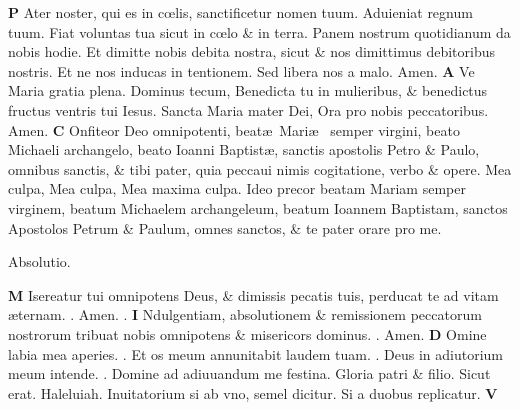 \documentclass[a5paper,10pt]{book}
\def\ae{æ}
\def\oe{œ}
\begin{document}
\begin{multicols*}{2}
\lettrine[lines=2]{\bfseries \color{red} P}{}
Ater noster, qui es in c\oe lis, sanctificetur %
nomen tuum. Aduieniat regnum tuum. Fiat voluntas tua sicut in c\oe lo \& in terra. Panem nostrum quotidianum da nobis hodie. Et dimitte nobis debita nostra, sicut \& nos dimittimus debitoribus nostris. Et ne nos inducas in tentionem. Sed libera nos a malo. Amen.
\lettrine[lines=2]{\bfseries \color{red} A}{}
Ve Maria gratia plena. Dominus tecum, Benedicta tu in mulieribus, \& benedictus fructus ventris tui Iesus. Sancta Maria mater Dei, Ora pro nobis peccatoribus. Amen.
\lettrine[lines=2]{\bfseries \color{red} C}{}
Onfiteor Deo omnipotenti, beat\ae \ Mari\ae \ %
semper virgini, beato Michaeli archangelo, beato Ioanni Baptist\ae , %
sanctis apostolis Petro \& Paulo, omnibus sanctis, \& \color{red} tibi pater, \color{black} quia peccaui nimis cogitatione, verbo \& opere. Mea culpa, Mea culpa, Mea maxima culpa. Ideo precor beatam Mariam semper virginem, beatum Michaelem archangeleum, beatum Ioannem Baptistam, sanctos Apostolos Petrum \& Paulum, omnes sanctos, \& \color{red} te pater \color{black} orare pro me.
\vspace{-1em}
\begin{center} \color{red}
Absolutio.
\end{center}
\vspace{-1em}
\lettrine[lines=2]{\bfseries \color{red} M}{}
Isereatur \color{red} tui \color{black} omnipotens Deus, \& dimissis pecatis \color{red} tuis, \color{black} perducat \color{red} te \color{black} ad vitam \ae ternam.
\newline \color{red} \Rbar . \color{black} Amen. \color{red} \Vbar . \color{black}
\lettrine[lines=2]{\bfseries \color{red} I}{}
Ndulgentiam, absolutionem \& remissionem peccatorum nostrorum tribuat nobis omnipotens \& misericors dominus.
\color{red} \Rbar . \color{black} Amen.
\lettrine[lines=2]{\bfseries \color{red} D}{}
Omine labia mea aperies.
\newline \color{red} \Rbar . \color{black} Et os meum annunitabit laudem tuam. \color{red} \Vbar . \color{black} Deus in adiutorium meum intende. \color{red} \Rbar . \color{black} Domine ad adiuuandum me festina. Gloria patri \& filio. Sicut erat. Haleluiah.
\newline
\color{red} Inuitatorium si ab vno, semel dicitur. Si a duobus replicatur. \color{black}
\lettrine[lines=2]{\bfseries \color{red} V}{}

\end{multicols*}
\end{document}
